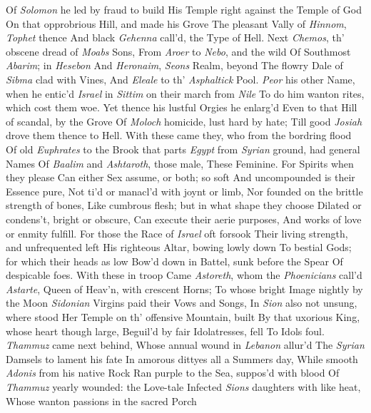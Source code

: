 \documentclass[11pt]{book}
\begin{document}
Of \textit{Solomon} he led by fraud to build 
His Temple right against the Temple of God 
On that opprobrious Hill, and made his Grove 
The pleasant Vally of \textit{Hinnom}, \textit{Tophet} thence 
And black \textit{Gehenna} call'd, the Type of Hell. 
Next \textit{Chemos}, th' obscene dread of \textit{Moabs} Sons, 
From \textit{Aroer} to \textit{Nebo}, and the wild 
Of Southmost \textit{Abarim}; in \textit{Hesebon} 
And \textit{Heronaim}, \textit{Seons} Realm, beyond 
The flowry Dale of \textit{Sibma} clad with Vines, 
And \textit{Eleale} to th' \textit{Asphaltick} Pool. 
\textit{Peor} his other Name, when he entic'd 
\textit{Israel} in \textit{Sittim} on their march from \textit{Nile} 
To do him wanton rites, which cost them woe. 
Yet thence his lustful Orgies he enlarg'd 
Even to that Hill of scandal, by the Grove 
Of \textit{Moloch} homicide, lust hard by hate; 
Till good \textit{Josiah} drove them thence to Hell. 
With these came they, who from the bordring flood 
Of old \textit{Euphrates} to the Brook that parts 
\textit{Egypt} from \textit{Syrian} ground, had general Names 
Of \textit{Baalim} and \textit{Ashtaroth}, those male, 
These Feminine.  For Spirits when they please 
Can either Sex assume, or both; so soft 
And uncompounded is their Essence pure, 
Not ti'd or manacl'd with joynt or limb, 
Nor founded on the brittle strength of bones, 
Like cumbrous flesh; but in what shape they choose 
Dilated or condens't, bright or obscure, 
Can execute their aerie purposes, 
And works of love or enmity fulfill. 
For those the Race of \textit{Israel} oft forsook 
Their living strength, and unfrequented left 
His righteous Altar, bowing lowly down 
To bestial Gods; for which their heads as low 
Bow'd down in Battel, sunk before the Spear 
Of despicable foes.  With these in troop 
Came \textit{Astoreth}, whom the \textit{Phoenicians} call'd 
\textit{Astarte}, Queen of Heav'n, with crescent Horns; 
To whose bright Image nightly by the Moon 
\textit{Sidonian} Virgins paid their Vows and Songs, 
In \textit{Sion} also not unsung, where stood 
Her Temple on th' offensive Mountain, built 
By that uxorious King, whose heart though large, 
Beguil'd by fair Idolatresses, fell 
To Idols foul.  \textit{Thammuz} came next behind, 
Whose annual wound in \textit{Lebanon} allur'd 
The \textit{Syrian} Damsels to lament his fate 
In amorous dittyes all a Summers day, 
While smooth \textit{Adonis} from his native Rock 
Ran purple to the Sea, suppos'd with blood 
Of \textit{Thammuz} yearly wounded: the Love-tale 
Infected \textit{Sions} daughters with like heat, 
Whose wanton passions in the sacred Porch 
\end{document}
